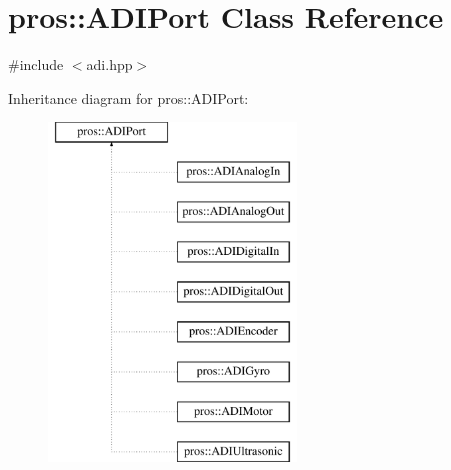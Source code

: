 \hypertarget{classpros_1_1ADIPort}{}\section{pros\+::A\+D\+I\+Port Class Reference}
\label{classpros_1_1ADIPort}


{\ttfamily \#include $<$adi.\+hpp$>$}

Inheritance diagram for pros\+::A\+D\+I\+Port\+:\begin{figure}[H]
\begin{center}
\leavevmode
\includegraphics[height=9.000000cm]{classpros_1_1ADIPort}
\end{center}
\end{figure}
